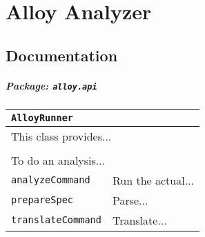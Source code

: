 \chapter{Alloy Analyzer}\label{App:AnalyzerCode}

\section{Documentation}

\paragraph*{\large Package: \texttt{alloy.api}}

    \begin{singlespacing}
    \begin{center}
    \begin{tabularx}{\linewidth}{|l|X|} \hline
    \multicolumn{2}{|p{420pt}|}{\texttt{\large AlloyRunner}} \\ \hline \hline

    \multicolumn{2}{|p{420pt}|}{\small This class provides...} \\
    \multicolumn{2}{|p{420pt}|}{} \\
    \multicolumn{2}{|p{420pt}|}{\small To do an analysis...}\\ \hline \hline

    {\small \texttt{analyzeCommand}} & {\small Run the actual...} \\ \hline

    {\small \texttt{prepareSpec}} & {\small Parse...} \\ \hline

    {\small \texttt{translateCommand}} & {\small Translate...} \\
    \hline

    \end{tabularx}
    \end{center}
    \end{singlespacing}
